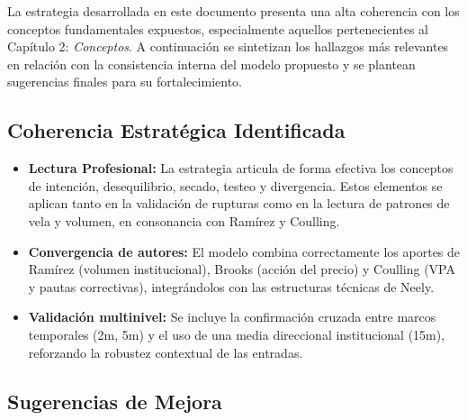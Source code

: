 La estrategia desarrollada en este documento presenta una alta coherencia con los conceptos fundamentales expuestos, especialmente aquellos pertenecientes al Cap\'itulo 2: \textit{Conceptos}. A continuaci\'on se sintetizan los hallazgos m\'as relevantes en relaci\'on con la consistencia interna del modelo propuesto y se plantean sugerencias finales para su fortalecimiento.

\subsection*{Coherencia Estrat\'egica Identificada}

\begin{itemize}
\item \textbf{Lectura Profesional:} La estrategia articula de forma efectiva los conceptos de intenci\'on, desequilibrio, secado, testeo y divergencia. Estos elementos se aplican tanto en la validaci\'on de rupturas como en la lectura de patrones de vela y volumen, en consonancia con Ram\'irez y Coulling.
\item \textbf{Convergencia de autores:} El modelo combina correctamente los aportes de Ram\'irez (volumen institucional), Brooks (acci\'on del precio) y Coulling (VPA y pautas correctivas), integr\'andolos con las estructuras t\'ecnicas de Neely.
\item \textbf{Validaci\'on multinivel:} Se incluye la confirmaci\'on cruzada entre marcos temporales (2m, 5m) y el uso de una media direccional institucional (15m), reforzando la robustez contextual de las entradas.
\end{itemize}

\subsection*{Sugerencias de Mejora}

